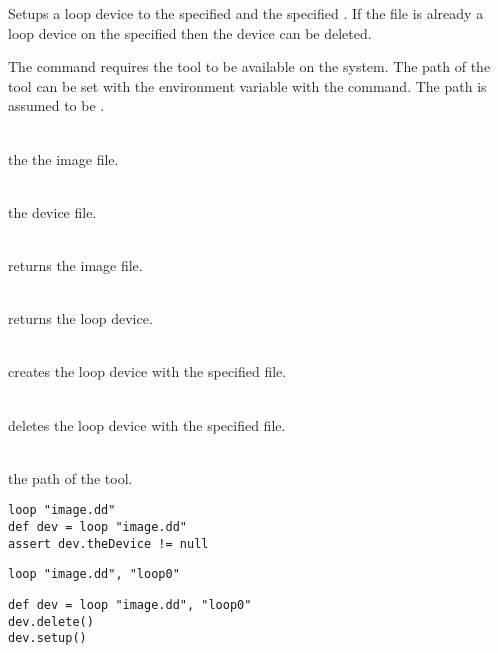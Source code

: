 %


Setups a loop device to the specified  and the specified . 
If the file is already a loop device on the specified  then 
the device can be deleted.

The command requires the tool \cite{losetup13} to be 
available on the system. The path of the tool can be set with the
environment variable  with the 
command. The path is assumed to be .

\begin{asparadesc}
%
\item[\code{file}] \hfill \\
the the image file.
%
\item[\code{device}] \hfill \\
the device file.
%
\item[\code{theFile}] \hfill \\
returns the image file.
%
\item[\code{theDevice}] \hfill \\
returns the loop device.
%
\item[\code{setup()}] \hfill \\
creates the loop device with the specified file.
%
\item[\code{delete()}] \hfill \\
deletes the loop device with the specified file.
%
\item[\code{LOSETUP\_COMMAND}] \hfill \\
the path of the  tool.
%
\end{asparadesc}

\begin{lstlisting}[style=Groovybash, label={lst:example_loop1}, title={
Setups the image file on the next available loop device.}]
loop "image.dd"
def dev = loop "image.dd"
assert dev.theDevice != null
\end{lstlisting}

\begin{lstlisting}[style=Groovybash, label={lst:example_loop2}, title={
Setups the image file on the specified loop device.}]
loop "image.dd", "loop0"
\end{lstlisting}

\begin{lstlisting}[style=Groovybash, label={lst:example_loop3}, title={
Deletes the loop device.}]
def dev = loop "image.dd", "loop0"
dev.delete()
dev.setup()
\end{lstlisting}

